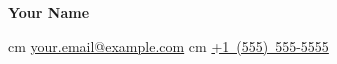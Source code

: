 \documentclass[11pt, letterpaper]{article}
\newenvironment{header}{
    \setlength{\topsep}{0pt}\par\kern\topsep\centering\linespread{1.5}
}{
    \par\kern\topsep
} %
\let\hrefWithoutArrow\href
\renewcommand{\href}[2]{\hrefWithoutArrow{#1}{#2 \raisebox{.15ex}{\footnotesize \faExternalLink*}}}
\begin{document}
    \begin{header}
        \textbf{\fontsize{24 pt}{24 pt}\selectfont Your Name}

        \normalsize
         cm%
        \mbox{\hrefWithoutArrow{mailto:your.email@example.com}{\color{black}{\footnotesize\faEnvelope[regular]}\hspace*{0.13cm}your.email@example.com}}%
         cm%
        \mbox{\hrefWithoutArrow{tel:+1-555-555-5555}{\color{black}{\footnotesize\faPhone*}\hspace*{0.13cm}+1 (555) 555-5555}}%
    \end{header}
    \vspace{0.5cm}
\end{document}
